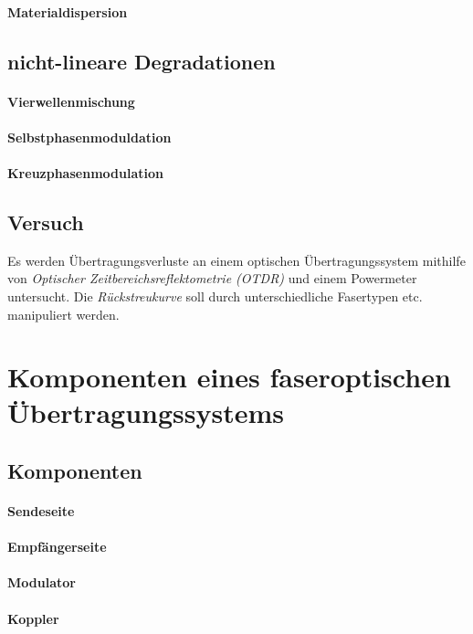 \documentclass[a4paper]{article}
\begin{document}
\paragraph{Materialdispersion}

\subsection{nicht-lineare Degradationen}
\paragraph{Vierwellenmischung}
\paragraph{Selbstphasenmoduldation}
\paragraph{Kreuzphasenmodulation}

\subsection{Versuch}
Es werden Übertragungsverluste an einem optischen Übertragungssystem
mithilfe von \emph{Optischer Zeitbereichsreflektometrie (OTDR)} und
einem Powermeter untersucht.
Die \emph{Rückstreukurve} soll durch unterschiedliche Fasertypen etc.
manipuliert werden.


\newpage
\section{Komponenten eines faseroptischen Übertragungssystems}
\subsection{Komponenten}
\paragraph{Sendeseite}
\paragraph{Empfängerseite}
\paragraph{Modulator}
\paragraph{Koppler}
\end{document}
